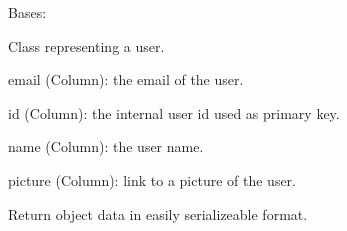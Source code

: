 \documentclass[letterpaper,10pt,english]{sphinxmanual}
\begin{document}
\begin{fulllineitems}
\label{database_setup:database_setup.User}
Bases: 

Class representing a user.

\begin{fulllineitems}
\label{database_setup:database_setup.User.email}
email (Column): the email of the user.

\end{fulllineitems}


\begin{fulllineitems}
\label{database_setup:database_setup.User.id}
id (Column): the internal user id used as primary key.

\end{fulllineitems}


\begin{fulllineitems}
\label{database_setup:database_setup.User.name}
name (Column): the user name.

\end{fulllineitems}


\begin{fulllineitems}
\label{database_setup:database_setup.User.picture}
picture (Column): link to a picture of the user.

\end{fulllineitems}


\begin{fulllineitems}
\label{database_setup:database_setup.User.serialize}
Return object data in easily serializeable format.

\end{fulllineitems}


\end{fulllineitems}
\end{document}
